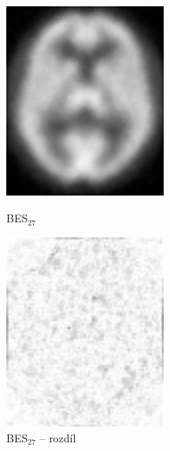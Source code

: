      \begin{figure}[h]
        \begin{minipage}[l]{0.5\textwidth}
            \center
            \includegraphics[width = 150pt]{src/8Appendix/final/10-100bes.png}
            \caption{BES$_{27}$}
        \end{minipage}
        \begin{minipage}[r]{0.5\textwidth}
            \center
            \includegraphics[width = 150pt]{src/8Appendix/final/10-100besD.png}
            \caption{BES$_{27}$ -- rozdíl}
        \end{minipage}
    \end{figure}
    

